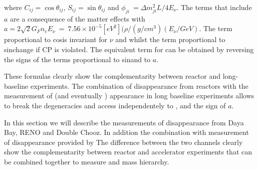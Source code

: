 where $C_{ij} = \cos \theta_{ij}$, $S_{ij} = \sin \theta_{ij}$ and $\phi_{ji}~= \Delta m^2_{ji} L / 4 E_{\nu}$. The terms that include $a$ are a consequence of the matter effects with $a=2\sqrt 2 G_F n_e E_{\nu}~=~7.56\times10^{-5} [eV^2](\rho/(g/cm^3)(E_{\nu}/GeV)$. The term proportional to cos\dcp is invariant for $\nu$ and \nub whilst the term proportional to sin\dcp change if CP is violated. 
The equivalent term for \pappb can be obtained by reversing the signs of the terms proportional to sin\dcp and to $a$. 

These formulas clearly show the complementarity between reactor and long-baseline experiments. The combination of \nueb disappearance from reactors with the measurement of \nue (and eventually \nueb) appearance in long baseline experiments allows to break the degeneracies and access independentely to \thint, \dcp and the sign of $a$.

In this section we will describe the measurements of \nueb disappearance from Daya Bay, RENO and Double Chooz. In addition the combination with measurement of \nueb disappearance provided by The difference between the two channels clearly show the complementarity between reactor and accelerator experiments that can be combined together to measure \dcp and mass hierarchy.
